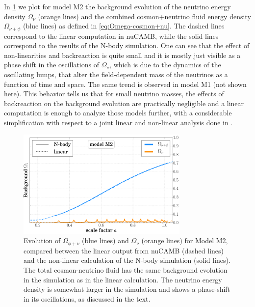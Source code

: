 In \cref{fig:bckg-mod2-1} we plot for model M2 the background
evolution of the neutrino energy density $\Omega_{\nu}$ (orange lines)
and the combined cosmon+neutrino fluid energy density $\Omega_{\nu+\phi}$
(blue lines) as defined in \cref{eq:Omega-cosmon+nu}. The
dashed lines correspond to the linear computation in nuCAMB, while
the solid lines correspond to the results of the N-body simulation.
One can see that the effect of non-linearities and backreaction is
quite small and it is mostly just visible as a phase shift in the
oscillations of $\Omega_{\nu}$, which is due to the dynamics of the
oscillating lumps, that alter the field-dependent mass of the neutrinos
as a function of time and space. The same trend is observed in model
M1 (not shown here). This behavior tells us that for small neutrino
masses, the effects of backreaction on the background evolution are
practically negligible and a linear computation is enough to analyze
those models further, with a considerable simplification with respect
to a joint linear and non-linear analysis done in \cite{pettorino_neutrino_2010}.

\begin{figure}
\centering{}\includegraphics[width=0.75\textwidth]{Chapters/gnq/figures/Background-model2-gnq-And-CAMB_OmegaFluidQNu-and-OmegaNu-v1}
\caption[Evolution of $\Omega_{\phi+\nu}$
and $\Omega_{\nu}$ for Model M2 in GNQ.]{\label{fig:bckg-mod2-1}Evolution of $\Omega_{\phi+\nu}$ (blue lines)
and $\Omega_{\nu}$ (orange lines) for Model M2, compared between
the linear output from nuCAMB (dashed lines) and the non-linear calculation
of the N-body simulation (solid lines). The total cosmon-neutrino
fluid has the same background evolution in the simulation as in the
linear calculation. The neutrino energy density is somewhat larger
in the simulation and shows a phase-shift in its oscillations, as
discussed in the text.}
\end{figure}


